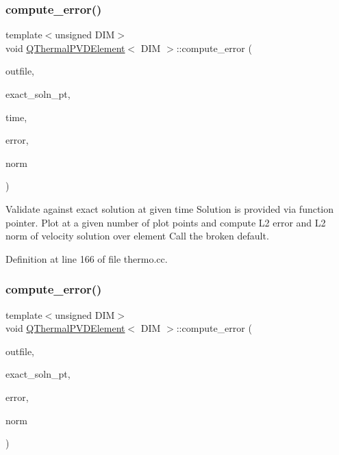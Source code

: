 \subsubsection{\texorpdfstring{compute\+\_\+error()}{compute\_error()}\hspace{0.1cm}{\footnotesize\ttfamily [1/2]}}
{\footnotesize\ttfamily template$<$unsigned D\+IM$>$ \\
void \hyperlink{classQThermalPVDElement}{Q\+Thermal\+P\+V\+D\+Element}$<$ D\+IM $>$\+::compute\+\_\+error (\begin{DoxyParamCaption}\item[{ostream \&}]{outfile,  }\item[{Finite\+Element\+::\+Unsteady\+Exact\+Solution\+Fct\+Pt}]{exact\+\_\+soln\+\_\+pt,  }\item[{const double \&}]{time,  }\item[{double \&}]{error,  }\item[{double \&}]{norm }\end{DoxyParamCaption})\hspace{0.3cm}{\ttfamily [inline]}}



Validate against exact solution at given time Solution is provided via function pointer. Plot at a given number of plot points and compute L2 error and L2 norm of velocity solution over element Call the broken default. 



Definition at line 166 of file thermo.\+cc.

\mbox{\label{classQThermalPVDElement_abbfb260a0c8dbf1dbfa797f15d98e0af}} 
\subsubsection{\texorpdfstring{compute\+\_\+error()}{compute\_error()}\hspace{0.1cm}{\footnotesize\ttfamily [2/2]}}
{\footnotesize\ttfamily template$<$unsigned D\+IM$>$ \\
void \hyperlink{classQThermalPVDElement}{Q\+Thermal\+P\+V\+D\+Element}$<$ D\+IM $>$\+::compute\+\_\+error (\begin{DoxyParamCaption}\item[{ostream \&}]{outfile,  }\item[{Finite\+Element\+::\+Steady\+Exact\+Solution\+Fct\+Pt}]{exact\+\_\+soln\+\_\+pt,  }\item[{double \&}]{error,  }\item[{double \&}]{norm }\end{DoxyParamCaption})\hspace{0.3cm}{\ttfamily [inline]}}



